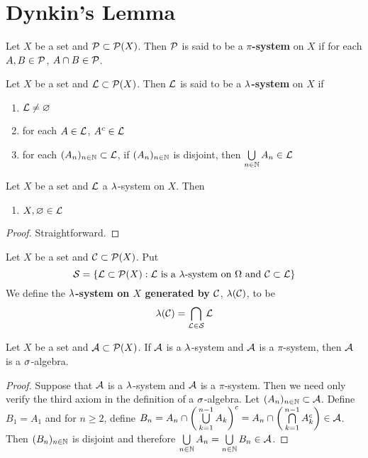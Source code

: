 \documentclass{book}
\begin{document}
	
	\newpage
	\section{Dynkin's Lemma}
	
	\begin{defn}
		Let $X$ be a set and $\mathcal{P} \subset \mathcal{P}(X)$. Then $\mathcal{P}$ is said to be a \textbf{$\pi$-system} on $X$ if for each $A,B \in \mathcal{P}$, $A \cap B \in \mathcal{P}$.
	\end{defn}
	
	\begin{defn}
		Let $X$ be a set and $\mathcal{L} \subset \mathcal{P}(X)$. Then $\mathcal{L}$ is said to be a \textbf{$\lambda$-system} on $X$ if 
		\begin{enumerate}
			\item $\mathcal{L} \neq \varnothing$
			\item for each $A \in \mathcal{L}$, $A^c \in \mathcal{L}$
			\item for each $(A_n)_{n \in \mathbb{N}} \subset \mathcal{L}$, if $(A_n)_{n \in \mathbb{N}}$ is disjoint, then $\bigcup\limits_{n \in \mathbb{N}}A_n \in \mathcal{L}$
		\end{enumerate}
	\end{defn}
	
	\begin{ex}
		Let $X$ be a set and $\mathcal{L}$ a $\lambda$-system on $X$. Then 
		\begin{enumerate}
			\item $X, \varnothing \in \mathcal{L}$
		\end{enumerate} 
	\end{ex}
	
	\begin{proof}
		Straightforward.
	\end{proof}
	
	\begin{defn}
		Let $X$ be a set and $\mathcal{C} \subset \mathcal{P}(X)$. Put $$\mathcal{S} = \{\mathcal{L} \subset \mathcal{P}(X): \mathcal{L} \text{ is a }\lambda\text{-system on }\Omega \text{ and } \mathcal{C} \subset \mathcal{L}\}$$ We define the \textbf{$\lambda$-system on $X$ generated by $\mathcal{C}$}, $\lambda(\mathcal{C})$, to be $$\lambda(\mathcal{C}) = \bigcap_{\mathcal{L} \in \mathcal{S}}\mathcal{L}$$
	\end{defn}
	
	\begin{ex}
		Let $X$ be a set and $\mathcal{A} \subset \mathcal{P}(X)$. If $\mathcal{A}$ is a $\lambda$-system and $\mathcal{A}$ is a $\pi$-system, then $\mathcal{A}$ is a $\sigma$-algebra.
	\end{ex}
	
	\begin{proof}
		Suppose that $\mathcal{A}$ is a $\lambda$-system and $\mathcal{A}$ is a $\pi$-system. Then we need only verify the third axiom in the definition of a $\sigma$-algebra. Let $(A_n)_{n \in \mathbb{N}} \subset \mathcal{A}$. Define $B_1 = A_1$ and for $n \geq 2$, define $B_n = A_n \cap \bigg( \bigcup\limits_{k=1}^{n-1}A_k \bigg)^c = A_n \cap \bigg( \bigcap\limits_{k=1}^{n-1}A_k^c \bigg) \in \mathcal{A}$. Then $(B_n)_{n \in \mathbb{N}}$ is disjoint and therefore $\bigcup\limits_{n \in \mathbb{N}}A_n = \bigcup\limits_{n \in \mathbb{N}}B_n \in \mathcal{A}$.
	\end{proof}
	
\end{document}
